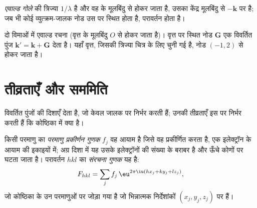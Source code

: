 \begin{definition}[एवाल्ड गोला]\label{def:b3:x-ray-diffraction:ewald}
\emph{एवाल्ड गोले} की त्रिज्या $1/\lambda$ है और वह
 के मूलबिंदु से होकर जाता है, उसका केंद्र मूलबिंदु से $-\mathbf k$ पर है; जब भी
कोई व्युत्क्रम-जालक नोड उस पर स्थित होता है, परावर्तन होता है।
\end{definition}

\begin{omfigure}

{\small दो विमाओं में एवाल्ड रचना (वृत्त  के
मूलबिंदु $O$ से होकर जाता है)। वृत्त पर स्थित नोड $\mathbf G$ एक
विवर्तित पुंज $\mathbf k' = \mathbf k + \mathbf G$ देता है। यहाँ वृत्त, जिसकी त्रिज्या चित्र के लिए
चुनी गई है, नोड $(-1, 2)$ से होकर जाता है।}
\end{omfigure}

\section{तीव्रताएँ और सममिति}

 विवर्तित पुंजों की दिशाएँ देता है, जो केवल
जालक पर निर्भर करती हैं; उनकी तीव्रताएँ इस पर निर्भर करती हैं कि कोष्ठिका में क्या है।

\begin{definition}\label{def:b3:x-ray-diffraction:structure-factor}
किसी परमाणु का \emph{परमाणु प्रकीर्णन गुणक} $f_j$
वह आयाम है जिसे वह प्रकीर्णित करता है, एक इलेक्ट्रॉन के आयाम की इकाइयों में; अग्र दिशा में यह
उसके इलेक्ट्रॉनों की संख्या के बराबर है और ऊँचे कोणों पर घटता जाता है।
परावर्तन $hkl$ का \emph{संरचना गुणक} यह है:
\[
F_{hkl} = \sum_jf_j\,\eu^{2\pi\iu(hx_j + ky_j + lz_j)},
\]
जो कोष्ठिका के उन परमाणुओं पर जोड़ा गया है जो भिन्नात्मक निर्देशांकों $(x_j, y_j, z_j)$ पर हैं।
\end{definition}


